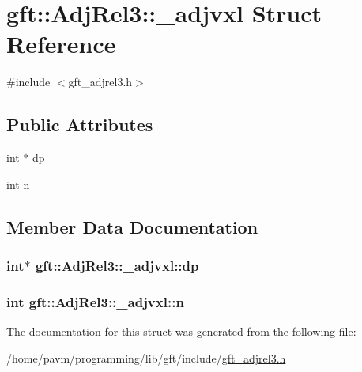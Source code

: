 \hypertarget{structgft_1_1AdjRel3_1_1__adjvxl}{\section{gft\-:\-:Adj\-Rel3\-:\-:\-\_\-adjvxl Struct Reference}
\label{structgft_1_1AdjRel3_1_1__adjvxl}
}


{\ttfamily \#include $<$gft\-\_\-adjrel3.\-h$>$}

\subsection*{Public Attributes}
\begin{DoxyCompactItemize}
\item 
int $\ast$ \hyperlink{structgft_1_1AdjRel3_1_1__adjvxl_a7206cf2e7a88b2ea92c7a4fea6f81ade}{dp}
\item 
int \hyperlink{structgft_1_1AdjRel3_1_1__adjvxl_afc39306a67ac29baa74d416e3959db76}{n}
\end{DoxyCompactItemize}


\subsection{Member Data Documentation}
\hypertarget{structgft_1_1AdjRel3_1_1__adjvxl_a7206cf2e7a88b2ea92c7a4fea6f81ade}{
\subsubsection[{dp}]{\setlength{\rightskip}{0pt plus 5cm}int$\ast$ gft\-::\-Adj\-Rel3\-::\-\_\-adjvxl\-::dp}}\label{structgft_1_1AdjRel3_1_1__adjvxl_a7206cf2e7a88b2ea92c7a4fea6f81ade}
\hypertarget{structgft_1_1AdjRel3_1_1__adjvxl_afc39306a67ac29baa74d416e3959db76}{
\subsubsection[{n}]{\setlength{\rightskip}{0pt plus 5cm}int gft\-::\-Adj\-Rel3\-::\-\_\-adjvxl\-::n}}\label{structgft_1_1AdjRel3_1_1__adjvxl_afc39306a67ac29baa74d416e3959db76}


The documentation for this struct was generated from the following file\-:\begin{DoxyCompactItemize}
\item 
/home/pavm/programming/lib/gft/include/\hyperlink{gft__adjrel3_8h}{gft\-\_\-adjrel3.\-h}\end{DoxyCompactItemize}
